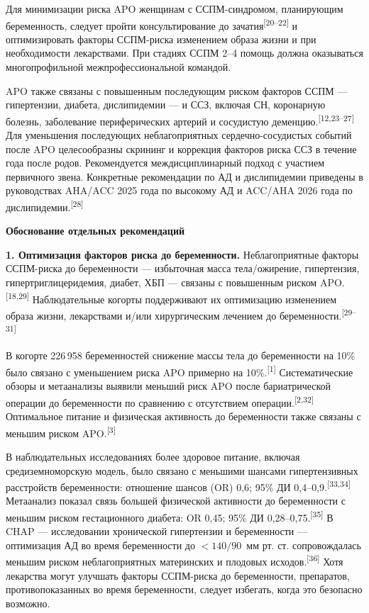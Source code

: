 \documentclass[11pt,a4paper]{article}
\newcommand{\src}[1]{\textsuperscript{[#1]}}
\newcommand{\heading}[1]{\par\medskip\textbf{#1}\par}
\begin{document}
Для минимизации риска APO женщинам с ССПМ-синдромом, планирующим беременность, следует пройти консультирование до зачатия\src{20--22} и оптимизировать факторы ССПМ-риска изменением образа жизни и при необходимости лекарствами. При стадиях ССПМ 2--4 помощь должна оказываться многопрофильной межпрофессиональной командой.

APO также связаны с повышенным последующим риском факторов ССПМ --- гипертензии, диабета, дислипидемии --- и ССЗ, включая СН, коронарную болезнь, заболевание периферических артерий и сосудистую деменцию.\src{12,23--27} Для уменьшения последующих неблагоприятных сердечно-сосудистых событий после APO целесообразны скрининг и коррекция факторов риска ССЗ в течение года после родов. Рекомендуется междисциплинарный подход с участием первичного звена. Конкретные рекомендации по АД и дислипидемии приведены в руководствах AHA/ACC 2025 года по высокому АД и ACC/AHA 2026 года по дислипидемии.\src{28}

\heading{Обоснование отдельных рекомендаций}
\textbf{1. Оптимизация факторов риска до беременности.} Неблагоприятные факторы ССПМ-риска до беременности --- избыточная масса тела/ожирение, гипертензия, гипертриглицеридемия, диабет, ХБП --- связаны с повышенным риском APO.\src{18,29} Наблюдательные когорты поддерживают их оптимизацию изменением образа жизни, лекарствами и/или хирургическим лечением до беременности.\src{29--31}

В когорте 226\,958 беременностей снижение массы тела до беременности на 10\% было связано с уменьшением риска APO примерно на 10\%.\src{1} Систематические обзоры и метаанализы выявили меньший риск APO после бариатрической операции до беременности по сравнению с отсутствием операции.\src{2,32} Оптимальное питание и физическая активность до беременности также связаны с меньшим риском APO.\src{3}

В наблюдательных исследованиях более здоровое питание, включая средиземноморскую модель, было связано с меньшими шансами гипертензивных расстройств беременности: отношение шансов (OR) 0,6; 95\% ДИ 0,4--0,9.\src{33,34} Метаанализ показал связь большей физической активности до беременности с меньшим риском гестационного диабета: OR 0,45; 95\% ДИ 0,28--0,75.\src{35} В CHAP --- исследовании хронической гипертензии и беременности --- оптимизация АД во время беременности до $<140/90$~мм рт. ст. сопровождалась меньшим риском неблагоприятных материнских и плодовых исходов.\src{36} Хотя лекарства могут улучшать факторы ССПМ-риска до беременности, препаратов, противопоказанных во время беременности, следует избегать, когда это безопасно возможно.
\end{document}
